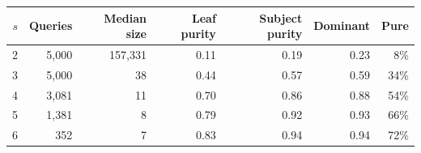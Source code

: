 \begin{tabular}{@{}rrrrrrr@{}}
\toprule
$s$ & Queries & Median size & Leaf purity & Subject purity & Dominant & Pure \\
\midrule
2 & 5,000 & 157,331 & 0.11 & 0.19 & 0.23 & 8\% \\
3 & 5,000 & 38 & 0.44 & 0.57 & 0.59 & 34\% \\
4 & 3,081 & 11 & 0.70 & 0.86 & 0.88 & 54\% \\
5 & 1,381 & 8 & 0.79 & 0.92 & 0.93 & 66\% \\
6 & 352 & 7 & 0.83 & 0.94 & 0.94 & 72\% \\
\bottomrule
\end{tabular}
